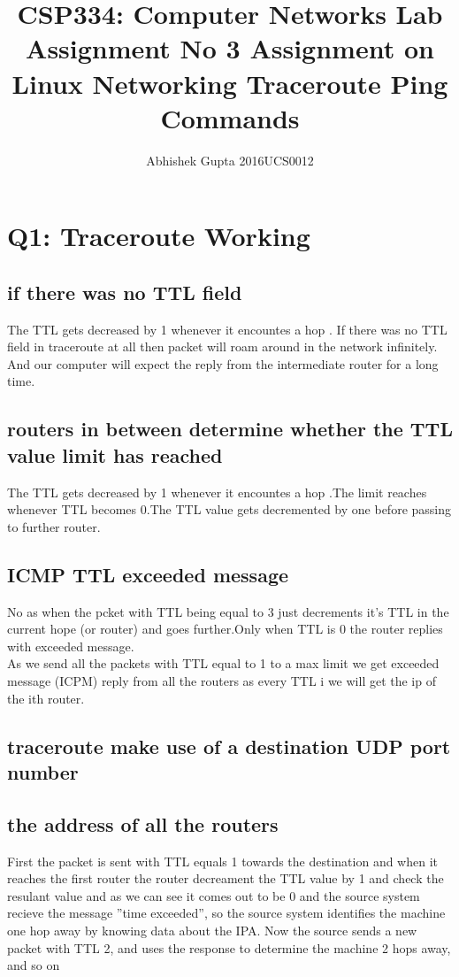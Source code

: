 \documentclass{article}
\title{CSP334: Computer Networks \linebreak
Lab Assignment No 3 \linebreak
Assignment on Linux Networking Traceroute Ping Commands}
\author{Abhishek Gupta  2016UCS0012}
\begin{document}
\maketitle


\section{Q1: Traceroute Working}

\subsection{if there was no TTL field}
The TTL gets decreased by 1 whenever it encountes a hop . If there was no TTL field in traceroute at all then packet will roam around in the network infinitely. And our
computer will expect the reply from the intermediate router for a long
time. 
\subsection{routers in between determine whether the TTL value limit has reached}
The TTL gets decreased by 1 whenever it encountes a hop .The limit reaches whenever TTL becomes 0.The TTL value gets decremented by one before passing to further router.
\subsection{ICMP TTL exceeded message}
No as when the pcket with TTL being equal to 3 just decrements it's TTL in the current hope (or router) and goes further.Only when TTL is 0 the router replies with exceeded message.\\
As we send all the packets with TTL equal to 1 to a max limit we get exceeded message (ICPM) reply from all the routers as every TTL i we will get the ip of the ith router.
\subsection{traceroute make use of a destination UDP port number}

\subsection{the address of all the routers}
First the packet is sent with TTL equals 1 towards the destination and
when it reaches the first router the router decreament the TTL value
by 1 and check the resulant value and as we can see it comes out to be
0 and the source system recieve the message ”time exceeded”, so the
source system identifies the machine one hop away by knowing data
about the IPA. Now the source sends a new packet with TTL 2, and
uses the response to determine the machine 2 hops away, and so on
\end{document}

